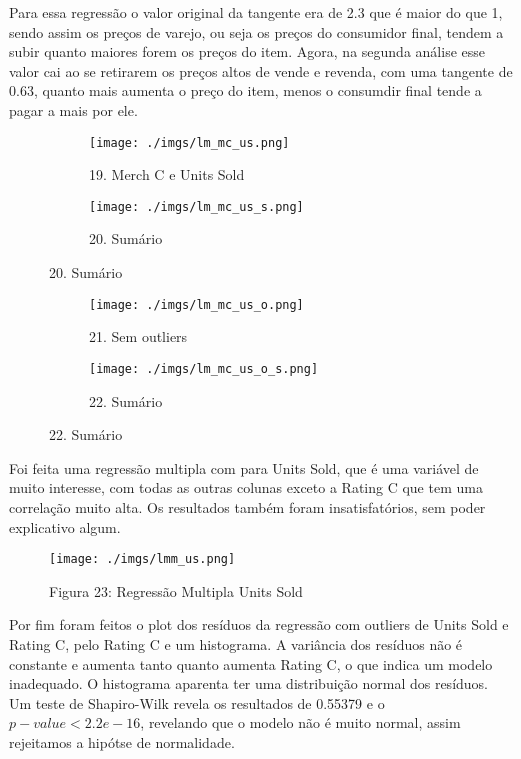 \documentclass[12pt, a4paper]{article}
\begin{document}
Para essa regressão o valor original da tangente era de 2.3 que é maior do que 1, sendo assim os preços de varejo, ou seja os preços do consumidor final, tendem a subir quanto maiores forem os preços do item. Agora, na segunda análise esse valor cai ao se retirarem os preços altos de vende e revenda, com uma tangente de 0.63, quanto mais aumenta o preço do item, menos o consumdir final tende a pagar a mais por ele.

\FloatBarrier
\begin{figure}[h]
  \begin{subfigure}[b]{0.4\textwidth}
    \texttt{[image: ./imgs/lm\_mc\_us.png]}
    \caption*{19. Merch C e Units Sold}
    \label{fig:1}
  \end{subfigure}
  \begin{subfigure}[b]{0.5\textwidth}
    \texttt{[image: ./imgs/lm\_mc\_us\_s.png]}
    \caption*{20. Sumário}
    \label{fig:2}
  \end{subfigure}
\end{figure}
\FloatBarrier 

\FloatBarrier
\begin{figure}[h]
  \begin{subfigure}[b]{0.4\textwidth}
    \texttt{[image: ./imgs/lm\_mc\_us\_o.png]}
    \caption*{21. Sem outliers}
    \label{fig:1}
  \end{subfigure}
  \begin{subfigure}[b]{0.5\textwidth}
    \texttt{[image: ./imgs/lm\_mc\_us\_o\_s.png]}
    \caption*{22. Sumário}
    \label{fig:2}
  \end{subfigure}
\end{figure}
\FloatBarrier 

Foi feita uma regressão multipla com para Units Sold, que é uma variável de muito interesse, com todas as outras colunas exceto a Rating C que tem uma correlação muito alta. Os resultados também foram insatisfatórios, sem poder explicativo algum.

\FloatBarrier
\begin{figure}[h]
\texttt{[image: ./imgs/lmm\_us.png]}
\caption*{Figura 23: Regressão Multipla Units Sold}
\end{figure}
\FloatBarrier 

Por fim foram feitos o plot dos resíduos da regressão com outliers de Units Sold e Rating C, pelo Rating C e um histograma. A variância dos resíduos não é constante e aumenta tanto quanto aumenta Rating C, o que indica um modelo inadequado. O histograma aparenta ter uma distribuição normal dos resíduos. Um teste de Shapiro-Wilk revela os resultados de 0.55379 e o $p-value < 2.2e-16$, revelando que o modelo não é muito normal, assim rejeitamos a hipótse de normalidade.
\end{document}
